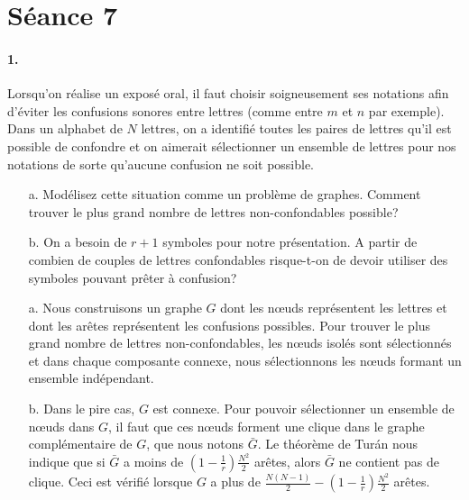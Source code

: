 %

\section{Séance 7}

\paragraph{1. } Lorsqu'on réalise un exposé oral, il faut choisir soigneusement ses notations afin d'éviter les confusions sonores entre lettres (comme entre $m$ et $n$ par exemple). Dans un alphabet de $N$ lettres, on a identifié toutes les paires de lettres qu'il est possible de confondre et on aimerait sélectionner un ensemble de lettres pour nos notations de sorte qu'aucune confusion ne soit possible.


\begin{enumerate}
  \item[a.] Modélisez cette situation comme un problème de graphes. Comment trouver le plus grand nombre de lettres non-confondables possible?
  \item[b.] On a besoin de $r+1$ symboles pour notre présentation. A partir de combien de couples de lettres confondables risque-t-on de devoir utiliser des symboles pouvant prêter à confusion?
\end{enumerate}

\begin{solution}
\begin{enumerate}
\item[a.]
Nous construisons un graphe $G$ dont les nœuds représentent les lettres et dont les arêtes représentent les confusions possibles. Pour trouver le plus grand nombre de lettres non-confondables, les nœuds isolés sont sélectionnés et dans chaque composante connexe, nous sélectionnons les nœuds formant un ensemble indépendant.

\item[b.]
Dans le pire cas, $G$ est connexe. Pour pouvoir sélectionner un ensemble de nœuds dans $G$, il faut que ces nœuds forment une clique dans le graphe complémentaire de $G$, que nous notons $\bar{G}$. Le théorème de Turán nous indique que si $\bar{G}$ a moins de $\left(1-\frac{1}{r}\right)\frac{N^2}{2}$ arêtes, alors $\bar{G}$ ne contient pas de clique. Ceci est vérifié lorsque $G$ a plus de $\frac{N(N-1)}{2}-\left(1-\frac{1}{r}\right)\frac{N^2}{2}$ arêtes.

\end{enumerate}
\end{solution}

